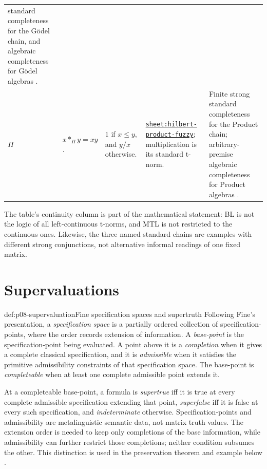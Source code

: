 \begin{landscape}
\begin{longtable}{@{}p{.10\linewidth}p{.18\linewidth}p{.20\linewidth}p{.20\linewidth}p{.23\linewidth}@{}}
standard completeness for the G\"odel chain, and algebraic completeness for
G\"odel algebras \cite{Hajek1998,CintulaHajekNoguera2011}. \\
\addlinespace
\(\Pi\) & \(x\mathbin{\ast_{\Pi}}y=xy\). & \(1\) if \(x\leq y\), and \(y/x\) otherwise.
& \hyperref[sheet:hilbert-product-fuzzy]{\texttt{sheet:hilbert-product-fuzzy}};
multiplication is its standard t-norm. & Finite strong standard completeness
for the Product chain; arbitrary-premise algebraic completeness for Product
algebras \cite{Hajek1998,CintulaHajekNoguera2011}. \\
\bottomrule
\end{longtable}
\end{landscape}

The table's continuity column is part of the mathematical statement: BL is not
the logic of all left-continuous t-norms, and MTL is not restricted to the
continuous ones.  Likewise, the three named standard chains are examples with
different strong conjunctions, not alternative informal readings of one fixed
matrix.

\section{Supervaluations}

\begin{hbdefinition}{def:p08-supervaluation}{Fine specification spaces and supertruth}
Following Fine's presentation, a \emph{specification space} is a partially
ordered collection of specification-points, where the order records extension
of information.  A \emph{base-point} is the specification-point being
evaluated.  A point above it is a \emph{completion} when it gives a complete
classical specification, and it is \emph{admissible} when it satisfies the
primitive admissibility constraints of that specification space.  The
base-point is \emph{completeable} when at least one complete admissible point
extends it.

At a completeable base-point, a formula is \emph{supertrue} iff it is true at
every complete admissible specification extending that point,
\emph{superfalse} iff it is false at every such specification, and
\emph{indeterminate} otherwise.  Specification-points and admissibility are
metalinguistic semantic data, not matrix truth values.  The extension order is
needed to keep only completions of the base information, while admissibility
can further restrict those completions; neither condition subsumes the other.
This distinction is used in the preservation theorem and example below
\cite{Fine1975}.
\end{hbdefinition}

